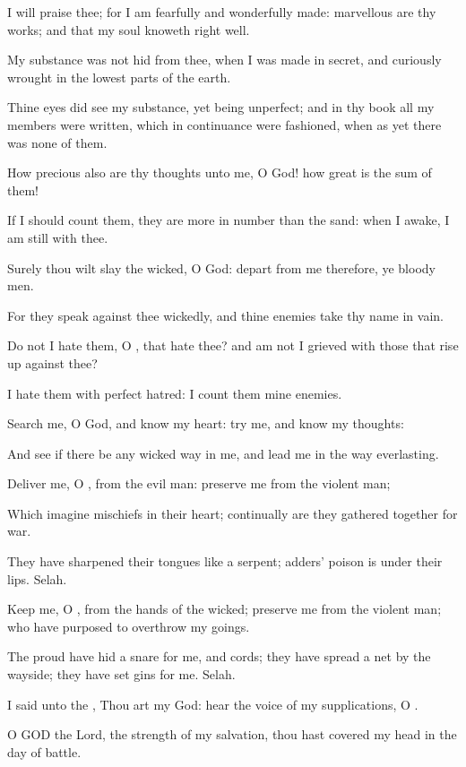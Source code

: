 \Verse I will praise thee; for I am fearfully and wonderfully made: marvellous are thy works; and that my soul knoweth right well.

\Verse My substance was not hid from thee, when I was made in secret, and curiously wrought in the lowest parts of the earth.

\Verse Thine eyes did see my substance, yet being unperfect; and in thy book all my members were written, which in continuance were fashioned, when as yet there was none of them.

\Verse How precious also are thy thoughts unto me, O God! how great is the sum of them!

\Verse If I should count them, they are more in number than the sand: when I awake, I am still with thee.

\Verse Surely thou wilt slay the wicked, O God: depart from me therefore, ye bloody men.

\Verse For they speak against thee wickedly, and thine enemies take thy name in vain.

\Verse Do not I hate them, O \LORD, that hate thee? and am not I grieved with those that rise up against thee?

\Verse I hate them with perfect hatred: I count them mine enemies.

\Verse Search me, O God, and know my heart: try me, and know my thoughts:

\Verse And see if there be any wicked way in me, and lead me in the way everlasting.




\Chapter
\Verse Deliver me, O \LORD, from the evil man: preserve me from the violent man;

\Verse Which imagine mischiefs in their heart; continually are they gathered together for war.

\Verse They have sharpened their tongues like a serpent; adders' poison is under their lips. Selah.

\Verse Keep me, O \LORD, from the hands of the wicked; preserve me from the violent man; who have purposed to overthrow my goings.

\Verse The proud have hid a snare for me, and cords; they have spread a net by the wayside; they have set gins for me. Selah.

\Verse I said unto the \LORD, Thou art my God: hear the voice of my supplications, O \LORD.

\Verse O GOD the Lord, the strength of my salvation, thou hast covered my head in the day of battle.

